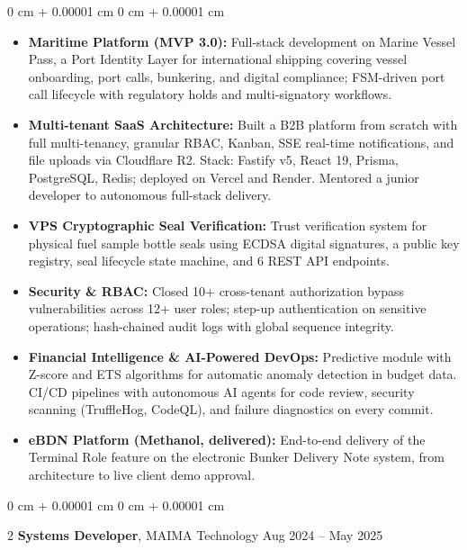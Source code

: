 \documentclass[10pt, letterpaper]{article}
\newenvironment{highlights}{ \begin{itemize}[ topsep=0.10 cm, parsep=0.10 cm, partopsep=0pt,
itemsep=0pt, leftmargin=0 cm + 10pt ] }{ \end{itemize} }
\newenvironment{onecolentry}{ \begin{adjustwidth}{ 0 cm + 0.00001 cm }{ 0 cm + 0.00001 cm }
}{ \end{adjustwidth} }
\newenvironment{twocolentry}[2][]{ \onecolentry \def\secondColumn{#2} \setcolumnwidth{\fill, 4.5 cm}
\begin{paracol}{2} }{ \switchcolumn \raggedleft \secondColumn \end{paracol}
\endonecolentry }
\begin{document}
	\vspace{0.10 cm}
	\begin{onecolentry}
		\begin{highlights}
			\item \textbf{Maritime Platform (MVP 3.0):} Full-stack development on Marine Vessel Pass, a Port Identity Layer for international shipping covering vessel onboarding, port calls, bunkering, and digital compliance; FSM-driven port call lifecycle with regulatory holds and multi-signatory workflows.
			\item \textbf{Multi-tenant SaaS Architecture:} Built a B2B platform from scratch with full multi-tenancy, granular RBAC, Kanban, SSE real-time notifications, and file uploads via Cloudflare R2. Stack: Fastify v5, React 19, Prisma, PostgreSQL, Redis; deployed on Vercel and Render. Mentored a junior developer to autonomous full-stack delivery.
			\item \textbf{VPS Cryptographic Seal Verification:} Trust verification system for physical fuel sample bottle seals using ECDSA digital signatures, a public key registry, seal lifecycle state machine, and 6 REST API endpoints.
			\item \textbf{Security \& RBAC:} Closed 10+ cross-tenant authorization bypass vulnerabilities across 12+ user roles; step-up authentication on sensitive operations; hash-chained audit logs with global sequence integrity.
			\item \textbf{Financial Intelligence \& AI-Powered DevOps:} Predictive module with Z-score and ETS algorithms for automatic anomaly detection in budget data. CI/CD pipelines with autonomous AI agents for code review, security scanning (TruffleHog, CodeQL), and failure diagnostics on every commit.
			\item \textbf{eBDN Platform (Methanol, delivered):} End-to-end delivery of the Terminal Role feature on the electronic Bunker Delivery Note system, from architecture to live client demo approval.
		\end{highlights}
	\end{onecolentry}

	\vspace{0.2 cm}

	\begin{twocolentry}
		{ Aug 2024 -- May 2025 } \textbf{Systems Developer}, MAIMA Technology
	\end{twocolentry}
\end{document}
